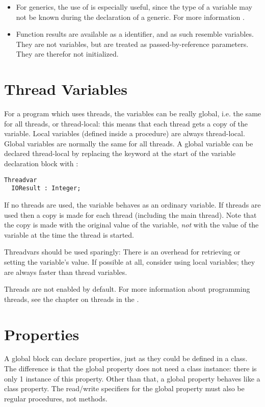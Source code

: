 \begin{remark}
\begin{itemize}
\item 
For generics, the use of  is especially useful, since the type of a variable may not 
be known during the declaration of a generic. For more information .
\item
Function results are available as a  identifier, and as such
resemble variables. They are not variables, but are treated as passed-by-reference
parameters. They are therefor not initialized.
\end{itemize}
\end{remark}

\section{Thread Variables}
For a program which uses threads, the variables can be really global, i.e. the same for all 
threads, or thread-local: this means that each thread gets a copy of the variable. 
Local variables (defined inside a procedure) are always thread-local. Global 
variables are normally the same for all threads. A global variable can be 
declared thread-local by replacing the  keyword at the start of the 
variable declaration block with :
\begin{verbatim}
Threadvar
  IOResult : Integer;
\end{verbatim}
If no threads are used, the variable behaves as an ordinary variable. 
If threads are used then a copy is made 
for each thread (including the main thread). Note that the copy is 
made with the original value  of the variable, {\em not} with the 
value of the variable at the time the thread is started.

Threadvars should be used sparingly: There is an overhead for retrieving 
or setting the variable's value. If possible at all, consider using local 
variables; they are always faster than thread variables.

Threads are not enabled by default. For more information about programming 
threads, see the chapter on threads in the \progref.

\section{Properties}
A global block can declare properties, just as they could be defined in a
class. The difference is that the global property does not need a class
instance: there is only 1 instance of this property. Other than that, a
global property behaves like a class property. The read/write specifiers for
the global property must also be regular procedures, not methods.

